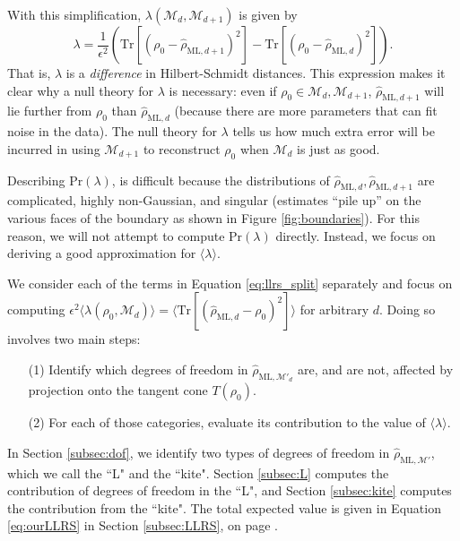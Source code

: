 \documentclass[aps,pra, twocolumn]{revtex4-1}
\newcommand{\M}{\mathcal{M}}
\newcommand{\rhohat}{\hat{\rho}}
\newcommand{\rhoML}[1]{\rhohat_{\scriptscriptstyle{\mathrm{ML},#1}}}
\begin{document}
With this simplification, $\lambda(\M_{d},\M_{d+1})$ is given by
\begin{equation}
\label{eq:llrs_split}
\lambda = \frac{1}{\epsilon^{2}}\left(\mathrm{Tr}[(\rho_{0} - \rhoML{d+1})^{2}] -  \mathrm{Tr}[(\rho_{0} - \rhoML{d})^{2}]\right).
\end{equation}
That is, $\lambda$ is a \emph{difference} in Hilbert-Schmidt distances. This expression makes it clear why a null theory for $\lambda$ is necessary: even if $\rho_{0} \in \M_{d},\M_{d+1}$, $\rhoML{d+1}$ will lie further from $\rho_{0}$ than $\rhoML{d}$ (because there are more parameters that can fit noise in the data). The null theory for $\lambda$ tells us how much extra error will be incurred in using $\M_{d+1}$ to reconstruct $\rho_{0}$ when $\M_{d}$ is just as good.

Describing $\mathrm{Pr}(\lambda)$, is difficult because the distributions of $\rhoML{d}, \rhoML{d+1}$ are complicated, highly non-Gaussian, and singular (estimates ``pile up'' on the various faces of the boundary as shown in Figure \ref{fig:boundaries}).  For this reason, we will not attempt to compute $\mathrm{Pr}(\lambda)$ directly.  Instead, we focus on deriving a good approximation for $\langle \lambda \rangle$.

We consider each of the terms in Equation \eqref{eq:llrs_split} separately and focus on computing $\epsilon^{2}\langle \lambda(\rho_{0}, \M_{d}) \rangle = \langle \mathrm{Tr}[(\rhoML{d}  - \rho_{0})^{2}] \rangle$ for arbitrary $d$.
Doing so involves two main steps:
\begin{itemize}
\item[(1)] Identify which degrees of freedom in $\rhoML{\M'_{d}}$ are, and are not, affected by projection onto the tangent cone $T(\rho_{0})$.
\item[(2)] For each of those categories, evaluate its contribution to the value of $\langle \lambda \rangle$.
\end{itemize}

In Section \ref{subsec:dof}, we identify two types of degrees of freedom in $\rhoML{\M'}$, which we call the ``L" and the ``kite". Section \ref{subsec:L} computes the contribution of degrees of freedom in the ``L", and Section \ref{subsec:kite} computes the contribution from the ``kite". The total expected value is given in Equation \eqref{eq:ourLLRS} in Section \ref{subsec:LLRS}, on page \pageref{eq:ourLLRS}.
\end{document}
